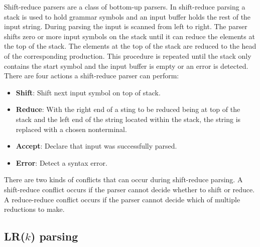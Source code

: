 Shift-reduce parsers are a class of bottom-up parsers. In shift-reduce parsing a stack is used to hold grammar symbols and an input buffer holds the rest of the input string.
During parsing the input is scanned from left to right. The parser shifts zero or more input symbols on the stack until it can reduce the elements at the top of the stack. The elements at the top of the stack are reduced to the head of the corresponding production. This procedure is repeated until the stack only contains the start symbol and the input buffer is empty or an error is detected. \cite{Aho.2007}\\
There are four actions a shift-reduce parser can perform:
\begin{itemize}%
	\item \textbf{Shift}: Shift next input symbol on top of stack.
	\item \textbf{Reduce}: With the right end of a sting to be reduced being at top of the stack and the left end of the string located within the stack, the string is replaced with a  chosen nonterminal.
	\item \textbf{Accept}: Declare that input was successfully parsed.
	\item \textbf{Error}: Detect a syntax error.
\end{itemize}
\cite{Aho.2007}


There are two kinds of conflicts that can occur during shift-reduce parsing. A shift-reduce conflict occurs if the parser cannot decide whether to shift or reduce.
A reduce-reduce conflict occurs if the parser cannot decide which of multiple reductions to make.\cite{Aho.2007}


\subsection{LR($k$) parsing}\label{sec:BackgroundParserLR}

